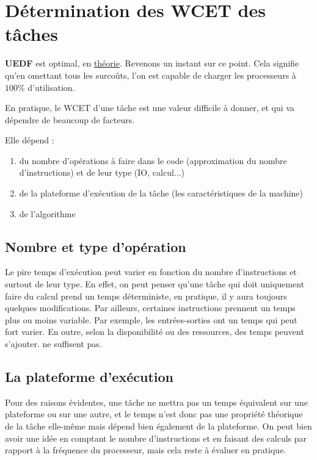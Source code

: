 \section{Détermination des WCET des tâches}
	\textbf{UEDF} est optimal, en \underline{théorie}. Revenons un instant sur ce point. 
	Cela signifie qu'en omettant tous les surcoûts, l'on est capable de charger les processeurs 
	à $100\%$ d'utilisation. \newline

	En pratique, le WCET d'une tâche est une valeur difficile à donner, et qui va dépendre de 
	beaucoup de facteurs.\newline
	
	Elle dépend :
	\begin{enumerate}
		\item du nombre d'opérations à faire dans le code (approximation du nombre d'instructions) et de leur type (IO, calcul...)
		\item de la plateforme d'exécution de la tâche (les caractéristiques de la machine)
		\item de l'algorithme 
	\end{enumerate}
	
	\subsection{Nombre et type d'opération}
	Le pire temps d'exécution peut varier en fonction du nombre d'instructions et surtout de leur type. En effet, 
	on peut penser qu'une tâche qui doit uniquement faire du calcul prend un temps déterministe, en pratique, 
	il y aura toujours quelques modifications. \newline
	Par ailleurs, certaines instructions prennent un temps plus ou moins variable. Par exemple, 
	les entrées-sorties ont un temps qui peut fort varier. En outre, selon la disponibilité ou 
	des ressources, des temps peuvent s'ajouter. 
	ne suffisent pas.
	
	\subsection{La plateforme d'exécution}
	Pour des raisons évidentes, une tâche ne mettra pas un temps équivalent sur une plateforme ou sur une autre, 
	et le temps n'est donc pas une propriété théorique de la tâche elle-même mais dépend bien 
	également de la plateforme. On peut bien avoir une idée en comptant le nombre d'instructions et en faisant 
	des calculs par rapport à la fréquence du processeur, mais cela reste à évaluer en pratique.\newline
	
